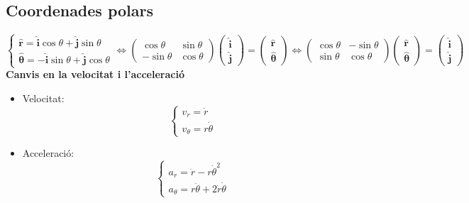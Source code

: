 \subsection{Coordenades polars}
\[
\begin{cases}
\hat{\mathbf{r}}=\hat{\mathbf{i}}\cos\theta+\hat{\mathbf{j}}\sin\theta\\
\hat{\mathbf{\theta}}=-\hat{\mathbf{i}}\sin\theta+\hat{\mathbf{j}}\cos\theta
\end{cases}\iff
\begin{pmatrix}
\cos\theta & \sin\theta\\
-\sin\theta & \cos\theta
\end{pmatrix}\begin{pmatrix}\hat{\mathbf{i}}\\ \hat{\mathbf{j}}\end{pmatrix}=
\begin{pmatrix}\hat{\mathbf{r}}\\ \hat{\mathbf{\theta}}\end{pmatrix}
\iff
\begin{pmatrix}
\cos\theta & -\sin\theta\\
\sin\theta & \cos\theta
\end{pmatrix}\begin{pmatrix}\hat{\mathbf{r}}\\ \hat{\mathbf{\theta}}\end{pmatrix}=
\begin{pmatrix}\hat{\mathbf{i}}\\ \hat{\mathbf{j}}\end{pmatrix}
\]
\textbf{Canvis en la velocitat i l'acceleració}
\begin{itemize}
	\item Velocitat:
		\[
		\begin{cases}
		v_r=\dot r \\
		v_\theta=r\dot\theta
		\end{cases}
		\]
	\item Acceleració:
		\[
		\begin{cases}
		a_r=\ddot r - r\dot\theta^2 \\
		a_\theta=r\ddot\theta + 2\dot r\dot\theta
		\end{cases}
		\]
\end{itemize}

